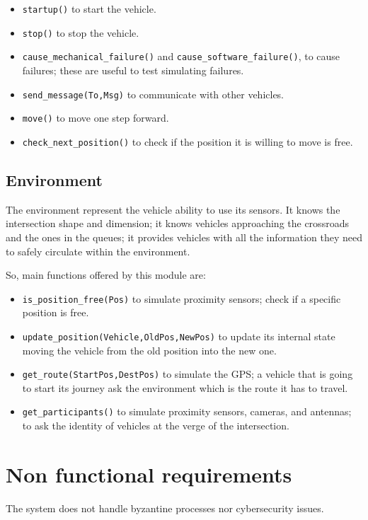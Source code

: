 \documentclass{memoir}
\begin{document}
\begin{itemize}
	\item \texttt{startup()} to start the vehicle.
	\item \texttt{stop()} to stop the vehicle.
	\item \texttt{cause\_mechanical\_failure()} and \texttt{cause\_software\_failure()}, to cause failures; these are useful to test simulating failures.
	\item \texttt{send\_message(To,Msg)} to communicate with other vehicles.
	\item \texttt{move()} to move one step forward.
	\item \texttt{check\_next\_position()} to check if the position it is willing to move is free.
\end{itemize}


\subsection{Environment}
The environment represent the vehicle ability to use its sensors. It knows the intersection shape and dimension; it knows vehicles approaching the crossroads and the ones in the queues; it provides vehicles with all the information they need to safely circulate within the environment.

So, main functions offered by this module are:

\begin{itemize}
	\item \texttt{is\_position\_free(Pos)} to simulate proximity sensors; check if a specific position is free.
	\item \texttt{update\_position(Vehicle,OldPos,NewPos)} to update its internal state moving the vehicle from the old position into the new one.
	\item \texttt{get\_route(StartPos,DestPos)} to simulate the GPS; a vehicle that is going to start its journey ask the environment which is the route it has to travel.
	\item \texttt{get\_participants()} to simulate proximity sensors, cameras, and antennas; to ask the identity of vehicles at the verge of the intersection. 
\end{itemize}

\section{Non functional requirements}
The system does not handle byzantine processes nor cybersecurity issues.
\end{document}
